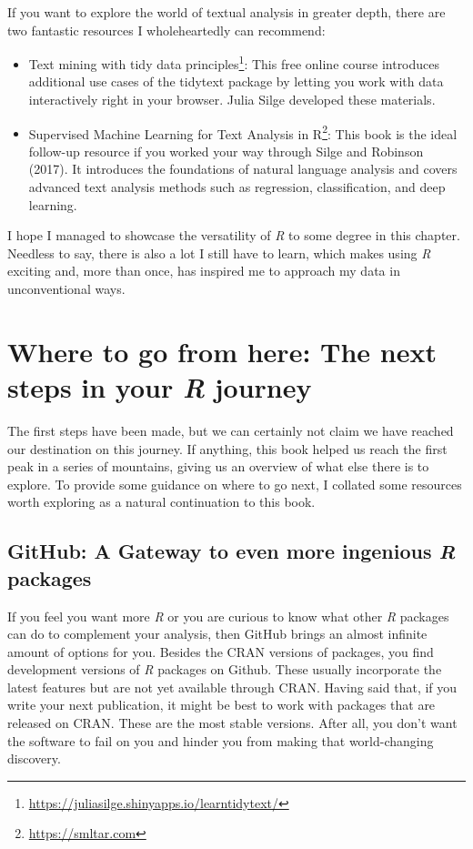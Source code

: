 \documentclass[
  letterpaper,
]{krantz}
\renewcommand{\href}[2]{#2\footnote{\url{#1}}}
\begin{document}
If you want to explore the world of textual analysis in greater depth,
there are two fantastic resources I wholeheartedly can recommend:

\begin{itemize}
\item
  \href{https://juliasilge.shinyapps.io/learntidytext/}{Text mining with
  tidy data principles}: This free online course introduces additional
  use cases of the tidytext package by letting you work with data
  interactively right in your browser. Julia Silge developed these
  materials.
\item
  \href{https://smltar.com}{Supervised Machine Learning for Text
  Analysis in R}: This book is the ideal follow-up resource if you
  worked your way through Silge and Robinson (2017). It introduces the
  foundations of natural language analysis and covers advanced text
  analysis methods such as regression, classification, and deep
  learning.
\end{itemize}

I hope I managed to showcase the versatility of \emph{R} to some degree
in this chapter. Needless to say, there is also a lot I still have to
learn, which makes using \emph{R} exciting and, more than once, has
inspired me to approach my data in unconventional ways.


\chapter{\texorpdfstring{Where to go from here: The next steps in your
\emph{R}
journey}{Where to go from here: The next steps in your R journey}}\label{sec-next-steps}

The first steps have been made, but we can certainly not claim we have
reached our destination on this journey. If anything, this book helped
us reach the first peak in a series of mountains, giving us an overview
of what else there is to explore. To provide some guidance on where to
go next, I collated some resources worth exploring as a natural
continuation to this book.

\section{\texorpdfstring{GitHub: A Gateway to even more ingenious
\emph{R}
packages}{GitHub: A Gateway to even more ingenious R packages}}\label{sec-next-steps-github}

If you feel you want more \emph{R} or you are curious to know what other
\emph{R} packages can do to complement your analysis, then GitHub brings
an almost infinite amount of options for you. Besides the CRAN versions
of packages, you find development versions of \emph{R} packages on
Github. These usually incorporate the latest features but are not yet
available through CRAN. Having said that, if you write your next
publication, it might be best to work with packages that are released on
CRAN. These are the most stable versions. After all, you don't want the
software to fail on you and hinder you from making that world-changing
discovery.
\end{document}
